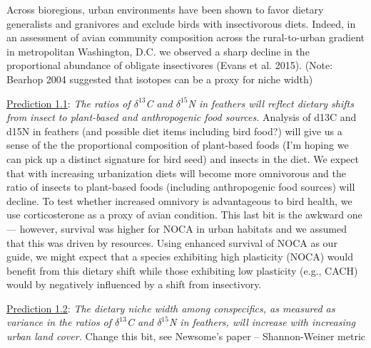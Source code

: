 \documentclass[12pt]{article}
\begin{document}
 \par
Across bioregions, urban environments have been shown to favor dietary generalists and granivores and exclude birds with insectivorous diets. Indeed, in an assessment of avian community composition across the rural-to-urban gradient in 
metropolitan Washington, D.C. we observed a sharp decline in the proportional abundance of obligate insectivores (Evans et al. 2015). (Note: Bearhop 2004 suggested that isotopes can be a proxy for niche width)\par


\noindent \underline{Prediction 1.1}: \textit{The ratios of $\delta^{13}$C and $\delta^{15}$N in feathers will reflect dietary shifts from insect to plant-based and anthropogenic food sources.}  Analysis of d13C and d15N in feathers (and possible diet items including bird food?) will give us a sense of the the proportional composition of plant-based foods (I’m hoping we can pick up a distinct signature for bird seed) and insects in the diet. We expect that with increasing urbanization diets will become more omnivorous and the ratio of insects to plant-based foods (including anthropogenic food sources) will decline. To test whether increased omnivory is advantageous to bird health, we use corticosterone as a proxy of avian condition. This last bit is the awkward one — however, survival was higher for NOCA in urban habitats and we assumed that this was driven by resources. Using enhanced survival of NOCA as our guide, we might expect that a species exhibiting high plasticity (NOCA) would benefit from this dietary shift while those exhibiting low plasticity (e.g., CACH) would by negatively influenced by a shift from insectivory.\par


\noindent \underline{Prediction 1.2}: \textit{ The dietary niche width among conspecifics, as measured as variance in the ratios of $\delta^{13}$C and $\delta^{15}$N in feathers,  will increase with increasing urban land cover.} Change this bit, 
see Newsome's paper -- Shannon-Weiner metric \\

\end{document}
